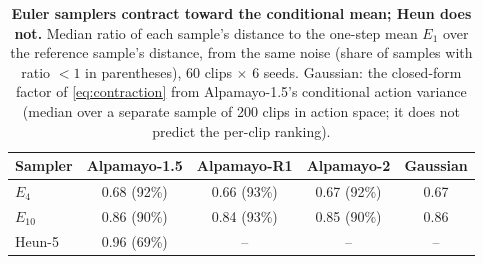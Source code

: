 \begin{table}[t]
  \caption{\textbf{Euler samplers contract toward the conditional mean; Heun does not.} Median ratio of each sample's distance to the one-step mean $E_1$ over the reference sample's distance, from the same noise (share of samples with ratio $<1$ in parentheses), 60 clips $\times$ 6 seeds. Gaussian: the closed-form factor of \cref{eq:contraction} from Alpamayo-1.5's conditional action variance (median over a separate sample of 200 clips in action space; it does not predict the per-clip ranking).}
  \label{tab:contraction}
  \centering\footnotesize\setlength{\tabcolsep}{3pt}
  \begin{tabular}{@{}lcccc@{}}
    \toprule
    Sampler & Alpamayo-1.5 & Alpamayo-R1 & Alpamayo-2 & Gaussian \\
    \midrule
    $E_4$ & 0.68 (92\%) & 0.66 (93\%) & 0.67 (92\%) & 0.67 \\
    $E_{10}$ & 0.86 (90\%) & 0.84 (93\%) & 0.85 (90\%) & 0.86 \\
    Heun-5 & 0.96 (69\%) & -- & -- & -- \\
    \bottomrule
  \end{tabular}
\end{table}
